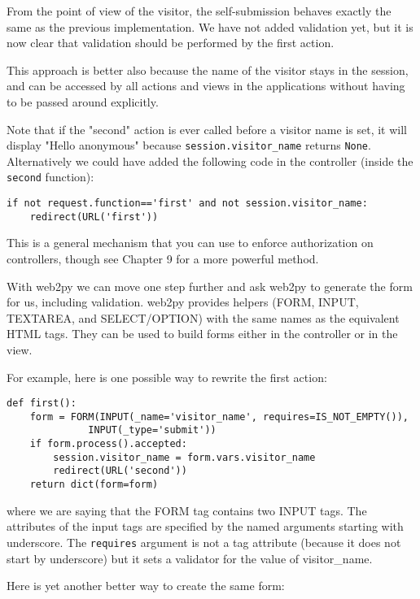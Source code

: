 \documentclass[justified,sixbynine,notoc]{tufte-book}
\def\ft{\small\tt}
\def\inxx#1{\index{#1}}
\begin{document}
\begin{fullwidth}
From the point of view of the visitor, the self-submission behaves exactly the same as the previous implementation. We have not added validation yet, but it is now clear that validation should be performed by the first action.

This approach is better also because the name of the visitor stays in the session, and can be accessed by all actions and views in the applications without having to be passed around explicitly.

Note that if the "second" action is ever called before a visitor name is set, it will display "Hello anonymous" because  {\ft session.visitor\_name} returns {\ft None}. Alternatively we could have added the following code in the controller (inside the {\ft second} function):

\begin{lstlisting}
if not request.function=='first' and not session.visitor_name:
    redirect(URL('first'))
\end{lstlisting}

This is a general mechanism that you can use to enforce authorization on controllers, though see Chapter 9 for a more powerful method.

\inxx{FORM} \inxx{INPUT} \inxx{requires} \inxx{IS\_NOT\_EMPTY} \inxx{accepts}

With web2py we can move one step further and ask web2py to generate the form for us, including validation. web2py provides helpers (FORM, INPUT, TEXTAREA, and SELECT/OPTION) with the same names as the equivalent HTML tags. They can be used to build forms either in the controller or in the view.

For example, here is one possible way to rewrite the first action:
\begin{lstlisting}
def first():
    form = FORM(INPUT(_name='visitor_name', requires=IS_NOT_EMPTY()),
              INPUT(_type='submit'))
    if form.process().accepted:
        session.visitor_name = form.vars.visitor_name
        redirect(URL('second'))
    return dict(form=form)
\end{lstlisting}
\noindent where we are saying that the FORM tag contains two INPUT tags. The attributes of the input tags are specified by the named arguments starting with underscore. The {\ft requires} argument is not a tag attribute (because it does not start by underscore) but it sets a validator for the value of visitor\_name.

Here is yet another better way to create the same form:


\end{fullwidth}
\end{document}
